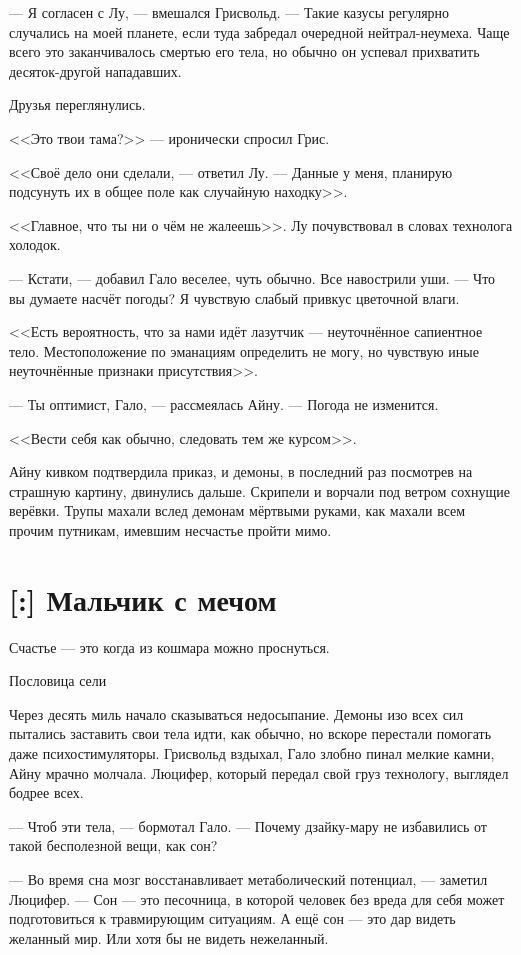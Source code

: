 --- Я согласен с Лу, --- вмешался Грисвольд.
--- Такие казусы регулярно случались на моей планете, если туда забредал очередной нейтрал-неумеха.
Чаще всего это заканчивалось смертью его тела, но обычно он успевал прихватить десяток-другой нападавших.

Друзья переглянулись.

<<Это твои тама?>> --- иронически спросил Грис.

<<Своё дело они сделали, --- ответил Лу.
--- Данные у меня, планирую подсунуть их в общее поле как случайную находку>>.

<<Главное, что ты ни о чём не жалеешь>>.
Лу почувствовал в словах технолога холодок.

--- Кстати, --- добавил Гало веселее, чуть обычно.
Все навострили уши.
--- Что вы думаете насчёт погоды?
Я чувствую слабый привкус цветочной влаги.

<<Есть вероятность, что за нами идёт лазутчик --- неуточнённое сапиентное тело.
Местоположение по эманациям определить не могу, но чувствую иные неуточнённые признаки присутствия>>.

--- Ты оптимист, Гало, --- рассмеялась Айну.
--- Погода не изменится.

<<Вести себя как обычно, следовать тем же курсом>>.

Айну кивком подтвердила приказ, и демоны, в последний раз посмотрев на страшную картину, двинулись дальше.
Скрипели и ворчали под ветром сохнущие верёвки.
Трупы махали вслед демонам мёртвыми руками, как махали всем прочим путникам, имевшим несчастье пройти мимо.

\section{[:] Мальчик с мечом}

\epigraph
{Счастье --- это когда из кошмара можно проснуться.}
{Пословица сели}

Через десять миль начало сказываться недосыпание.
Демоны изо всех сил пытались заставить свои тела идти, как обычно, но вскоре перестали помогать даже психостимуляторы.
Грисвольд вздыхал, Гало злобно пинал мелкие камни, Айну мрачно молчала.
Люцифер, который передал свой груз технологу, выглядел бодрее всех.

--- Чтоб эти тела, --- бормотал Гало.
--- Почему дзайку-мару не избавились от такой бесполезной вещи, как сон?

--- Во время сна мозг восстанавливает метаболический потенциал, --- заметил Люцифер.
--- Сон --- это песочница, в которой человек без вреда для себя может подготовиться к травмирующим ситуациям.
А ещё сон --- это дар видеть желанный мир.
Или хотя бы не видеть нежеланный.

